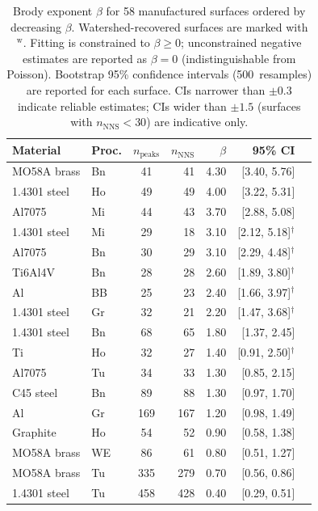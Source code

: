 \documentclass[final,1p,times]{elsarticle}
\theoremstyle{definition}
\begin{document}
\begin{table}[htbp]
  \centering
  \caption{Brody exponent $\beta$ for 58 manufactured surfaces
           ordered by decreasing $\beta$. Watershed-recovered
           surfaces are marked with $^{\text{w}}$. Fitting is constrained
           to $\beta \geq 0$; unconstrained negative estimates
           are reported as $\beta = 0$ (indistinguishable from
           Poisson). Bootstrap 95\% confidence intervals
           (500~resamples) are reported for each surface.
           CIs narrower than $\pm 0.3$ indicate reliable
           estimates; CIs wider than $\pm 1.5$ (surfaces with
           $n_{\text{NNS}} < 30$) are indicative only.}
  \label{tab:brody}
  \small
  \begin{tabular}{@{}llcrrrc@{}}
    \toprule
    Material & Proc. & $n_{\text{peaks}}$ & $n_{\text{NNS}}$ &
    $\beta$ & 95\% CI \\
    \midrule
    MO58A brass & Bn & 41 & 41 & 4.30 & [3.40, 5.76] \\
    1.4301 steel & Ho & 49 & 49 & 4.00 & [3.22, 5.31] \\
    Al7075 & Mi & 44 & 43 & 3.70 & [2.88, 5.08] \\
    1.4301 steel & Mi & 29 & 18 & 3.10 & [2.12, 5.18]$^{\dagger}$ \\
    Al7075 & Bn & 30 & 29 & 3.10 & [2.29, 4.48]$^{\dagger}$ \\
    Ti6Al4V & Bn & 28 & 28 & 2.60 & [1.89, 3.80]$^{\dagger}$ \\
    Al & BB & 25 & 23 & 2.40 & [1.66, 3.97]$^{\dagger}$ \\
    1.4301 steel & Gr & 32 & 21 & 2.20 & [1.47, 3.68]$^{\dagger}$ \\
    1.4301 steel & Bn & 68 & 65 & 1.80 & [1.37, 2.45] \\
    Ti & Ho & 32 & 27 & 1.40 & [0.91, 2.50]$^{\dagger}$ \\
    Al7075 & Tu & 34 & 33 & 1.30 & [0.85, 2.15] \\
    C45 steel & Bn & 89 & 88 & 1.30 & [0.97, 1.70] \\
    Al & Gr & 169 & 167 & 1.20 & [0.98, 1.49] \\
    Graphite & Ho & 54 & 52 & 0.90 & [0.58, 1.38] \\
    MO58A brass & WE & 86 & 61 & 0.80 & [0.51, 1.27] \\
    MO58A brass & Tu & 335 & 279 & 0.70 & [0.56, 0.86] \\
    1.4301 steel & Tu & 458 & 428 & 0.40 & [0.29, 0.51] \\

\end{tabular}
\end{table}
\end{document}
